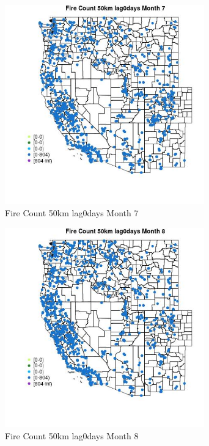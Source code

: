 \begin{figure} 
\centering  
\includegraphics[width=0.77\textwidth]{Code_Outputs/Report_ML_input_PM25_Step4_part_f_de_duplicated_aves_prioritize_24hr_obswNAs_MapObsMo7Fire_Count_50km_lag0days.jpg} 
\caption{\label{fig:Report_ML_input_PM25_Step4_part_f_de_duplicated_aves_prioritize_24hr_obswNAsMapObsMo7Fire_Count_50km_lag0days}Fire Count 50km lag0days Month 7} 
\end{figure} 
 

\begin{figure} 
\centering  
\includegraphics[width=0.77\textwidth]{Code_Outputs/Report_ML_input_PM25_Step4_part_f_de_duplicated_aves_prioritize_24hr_obswNAs_MapObsMo8Fire_Count_50km_lag0days.jpg} 
\caption{\label{fig:Report_ML_input_PM25_Step4_part_f_de_duplicated_aves_prioritize_24hr_obswNAsMapObsMo8Fire_Count_50km_lag0days}Fire Count 50km lag0days Month 8} 
\end{figure} 
 


